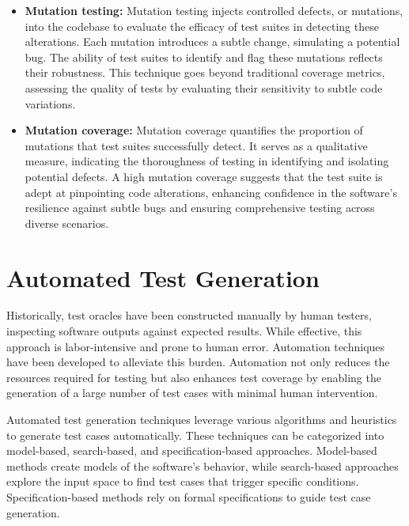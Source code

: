 \begin{itemize}
  \item \textbf{Mutation testing:} Mutation testing injects controlled defects, or mutations, into the codebase to evaluate the efficacy of test suites in detecting these alterations. Each mutation introduces a subtle change, simulating a potential bug. The ability of test suites to identify and flag these mutations reflects their robustness. This technique goes beyond traditional coverage metrics, assessing the quality of tests by evaluating their sensitivity to subtle code variations.
  \item \textbf{Mutation coverage:} Mutation coverage quantifies the proportion of mutations that test suites successfully detect. It serves as a qualitative measure, indicating the thoroughness of testing in identifying and isolating potential defects. A high mutation coverage suggests that the test suite is adept at pinpointing code alterations, enhancing confidence in the software's resilience against subtle bugs and ensuring comprehensive testing across diverse scenarios.
  
  
\end{itemize}



\section{Automated Test Generation}
\label{sec:automated_test_generation}
\vspace{0.2 cm}

Historically, test oracles have been constructed manually by human testers, inspecting software outputs against expected results. While effective, this approach is labor-intensive and prone to human error. Automation techniques have been developed to alleviate this burden. Automation not only reduces the resources required for testing but also enhances test coverage by enabling the generation of a large number of test cases with minimal human intervention.

Automated test generation techniques leverage various algorithms and heuristics to generate test cases automatically. These techniques can be categorized into model-based, search-based, and specification-based approaches. Model-based methods create models of the software's behavior, while search-based approaches explore the input space to find test cases that trigger specific conditions. Specification-based methods rely on formal specifications to guide test case generation.

